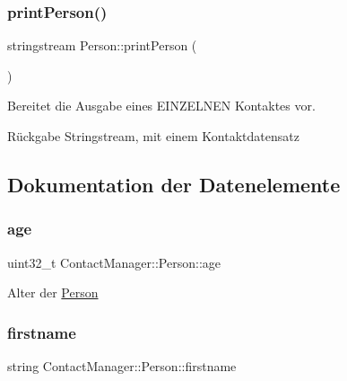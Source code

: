 \subsubsection{\texorpdfstring{print\+Person()}{printPerson()}}
{\footnotesize\ttfamily stringstream Person\+::print\+Person (\begin{DoxyParamCaption}{ }\end{DoxyParamCaption})}



Bereitet die Ausgabe eines E\+I\+N\+Z\+E\+L\+N\+EN Kontaktes vor.

\begin{DoxyReturn}{Rückgabe}
Stringstream, mit einem Kontaktdatensatz
\end{DoxyReturn}


\subsection{Dokumentation der Datenelemente}
\mbox{\label{classContactManager_1_1Person_a213b6be638a046de34bce8fc8301288c}} 
\subsubsection{\texorpdfstring{age}{age}}
{\footnotesize\ttfamily uint32\+\_\+t Contact\+Manager\+::\+Person\+::age\hspace{0.3cm}{\ttfamily [protected]}}



Alter der \hyperlink{classContactManager_1_1Person}{Person}

\mbox{\label{classContactManager_1_1Person_a9337552bd8f1b26c6d9b73294d524948}} 
\subsubsection{\texorpdfstring{firstname}{firstname}}
{\footnotesize\ttfamily string Contact\+Manager\+::\+Person\+::firstname\hspace{0.3cm}{\ttfamily [protected]}}




